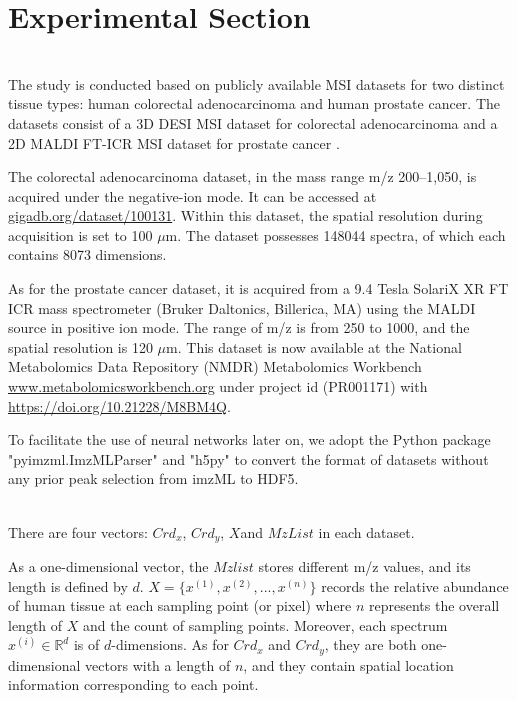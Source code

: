 \documentclass{WileyMSP-template}
\begin{document}
\section{Experimental Section}
 \\
The study is conducted  based on publicly available MSI datasets for 
two distinct tissue types: human colorectal adenocarcinoma and human 
prostate cancer. The datasets consist of a 3D DESI MSI dataset for colorectal 
adenocarcinoma \cite{oetjen2015benchmark} and a 
2D MALDI FT-ICR MSI dataset for prostate cancer \cite{abdelmoula2021peak}.

The colorectal adenocarcinoma dataset, 
in the mass range m/z 200–1,050, is acquired under the negative-ion 
mode. It can be accessed 
at \href{http://gigadb.org/dataset/100131}{gigadb.org/dataset/100131}.
Within this dataset,  the spatial resolution during acquisition is set to 100 $\mu$m. 
The dataset possesses 148044 spectra, of which each contains 8073 dimensions.

As for the prostate cancer dataset, it is acquired from a 
9.4 Tesla SolariX XR FT ICR mass spectrometer (Bruker Daltonics, Billerica, MA) 
using the MALDI source in positive ion mode. The range of m/z is from 250 to 1000, 
and the spatial resolution is 120 $\mu$m. 
This dataset is now available at the National Metabolomics Data Repository (NMDR) Metabolomics 
Workbench \href{https://www.metabolomicsworkbench.org}{www.metabolomicsworkbench.org} 
under project id (PR001171) with \href{https://doi.org/10.21228/M8BM4Q}{https://doi.org/10.21228/M8BM4Q}.

To facilitate the use of neural networks later on, we adopt the Python package "pyimzml.ImzMLParser" 
and "h5py" to convert the format of datasets without any prior peak 
selection from imzML \cite{race2012inclusive} to HDF5. 

\\
There are four vectors: $ Crd_x$, $Crd_y$, $X $and $MzList$ in each dataset.

As a one-dimensional vector, the $Mzlist$ stores different m/z values, 
and its length is defined by $d$.  
$ X = \{ x^{(1)},x^{(2)},...,x^{(n)}\}$ records 
the relative abundance of human tissue at each sampling point (or pixel) where $n$ represents the 
overall length of $X$ and the count of sampling points. Moreover, each spectrum $x^{(i)} \in \mathbb{R} ^{d}$ 
is of $d$-dimensions. As for $ Crd_x$ and  $Crd_y$, they are both one-dimensional vectors with a length of $n$, and they 
contain spatial location information corresponding to each point. 
\end{document}
